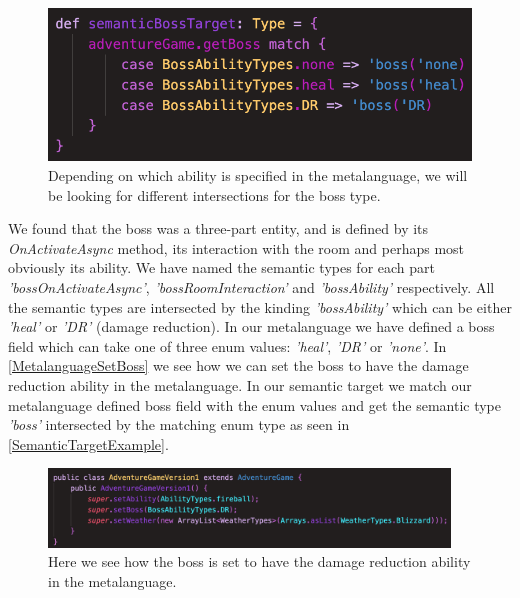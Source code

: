 \begin{figure}
	\includegraphics[width=\linewidth]{Materials/Decomposition/Boss/SemanticTarget}
	\caption{Depending on which ability is specified in the metalanguage, we will be looking for different intersections for the boss type.}
	\label{SemanticTargetExample}
\end{figure}
We found that the boss was a three-part entity, and is defined by its \textit{OnActivateAsync} method, its interaction with the room and perhaps most obviously its ability. We have named the semantic types for each part \textit{'bossOnActivateAsync'}, \textit{'bossRoomInteraction'} and \textit{'bossAbility'} respectively. All the semantic types are intersected by the kinding \textit{'bossAbility'} which can be either \textit{'heal'} or \textit{'DR'} (damage reduction). In our metalanguage we have defined a boss field which can take one of three enum values: \textit{'heal'}, \textit{'DR'} or \textit{'none'}. In \autoref{MetalanguageSetBoss} we see how we can set the boss to have the damage reduction ability in the metalanguage. In our semantic target we match our metalanguage defined boss field with the enum values and get the semantic type \textit{'boss'} intersected by the matching enum type as seen in \autoref{SemanticTargetExample}.
\begin{figure}[H]
	\centering
	\includegraphics[width=0.95\textwidth]{Materials/Decomposition/Boss/MetalanguageSetBoss}
	\caption{Here we see how the boss is set to have the damage reduction ability in the metalanguage.}
	\label{MetalanguageSetBoss}
\end{figure}

